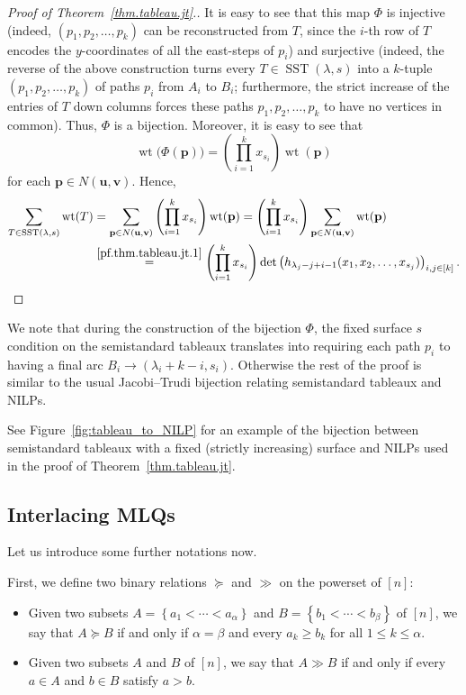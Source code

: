 \documentclass[reqno]{amsart}
\newcommand{\0}{\phantom{c}}
\DeclareMathOperator{\wt}{wt} %
\DeclareMathOperator{\SST}{SST} %
\newcommand{\pp}{\mathbf{p}}
\newcommand{\uu}{\mathbf{u}}
\newcommand{\vv}{\mathbf{v}}
\let\sumnonlimits\sum
\let\prodnonlimits\prod
\renewcommand{\sum}{\sumnonlimits\limits}
\renewcommand{\prod}{\prodnonlimits\limits}
\newenvironment{verlong}{}{}
\newcommand{\set}[1]{\left\{ #1 \right\}}
\newcommand{\tup}[1]{\left( #1 \right)}
\newcommand{\ive}[1]{\left[ #1 \right]}
\newcommand{\defn}[1]{{\color{darkred}\emph{#1}}} %
\theoremstyle{plain}
\theoremstyle{definition}
\numberwithin{equation}{section}
\begin{document}
\begin{verlong}
\begin{proof}[Proof of Theorem~\ref{thm.tableau.jt}.]
It is easy to see that this map $\Phi$ is injective (indeed, $\tup{p_1,p_2,\dotsc,p_k}$ can be reconstructed from $T$, since the $i$-th row of $T$ encodes the $y$-coordinates of all the east-steps of $p_i$) and surjective (indeed, the reverse of the above construction turns every $T \in \SST(\lambda, s)$ into a $k$-tuple $\tup{p_1, p_2, \dotsc, p_k}$ of paths $p_i$ from $A_i$ to $B_i$; furthermore, the strict increase of the entries of $T$ down columns forces these paths $p_1,p_2,\ldots,p_k$ to have no vertices in common).
Thus, $\Phi$ is a bijection.
Moreover, it is easy to see that
\[
\wt\bigl(  \Phi(\pp) \bigr) = \left( \prod_{i=1}^k x_{s_i} \right) \wt(\pp)
\]
for each $\pp \in N(\uu,\vv)$.
Hence,
\begin{align*}
\sum_{T \in \SST(\lambda, s)} \wt(T)  &  = \sum_{\pp\in N(\uu,\vv)  }\left( \prod_{i=1}^k x_{s_i} \right)  \wt(\pp)
= \left( \prod_{i=1}^k x_{s_i} \right) \sum_{\pp\in N(\uu,\vv)  } \wt(\pp) \\
&  \overset{\eqref{pf.thm.tableau.jt.1}}{=} \left(  \prod_{i=1}^k x_{s_i} \right)  \det\left( h_{\lambda_j-j+i-1}(x_1, x_2, \dotsc, x_{s_j}) \right)_{i, j \in \ive{k}}.
\end{align*}
\end{proof}

We note that during the construction of the bijection $\Phi$, the fixed surface $s$ condition on the semistandard tableaux translates into requiring each path $p_i$ to having a final arc $B_i \to (\lambda_i + k - i, s_i)$.
Otherwise the rest of the proof is similar to the usual Jacobi--Trudi bijection relating semistandard tableaux and NILPs.
\end{verlong}

See Figure~\ref{fig:tableau_to_NILP} for an example of the bijection between semistandard tableaux with a fixed (strictly increasing) surface and NILPs used in the proof of Theorem~\ref{thm.tableau.jt}.


\subsection{Interlacing MLQs}

Let us introduce some further notations now.

First, we define two binary relations $\succeq$ and $\gg$ on the powerset of $\ive{n}$:

\begin{itemize}
\item Given two subsets $A = \set{a_1 < \cdots < a_{\alpha}} $ and $B = \set{b_1 < \cdots < b_{\beta}}$ of $\ive{n}$, we say that \defn{$A\succeq B$} if and only if $\alpha =\beta$ and every $a_k \geq b_k$ for all $1 \leq k \leq \alpha$.

\item Given two subsets $A$ and $B$ of $\ive{n}$, we say that \defn{$A \gg B$} if and only if every $a \in A$ and $b \in B$ satisfy $a > b$.
\end{itemize}
\end{document}
